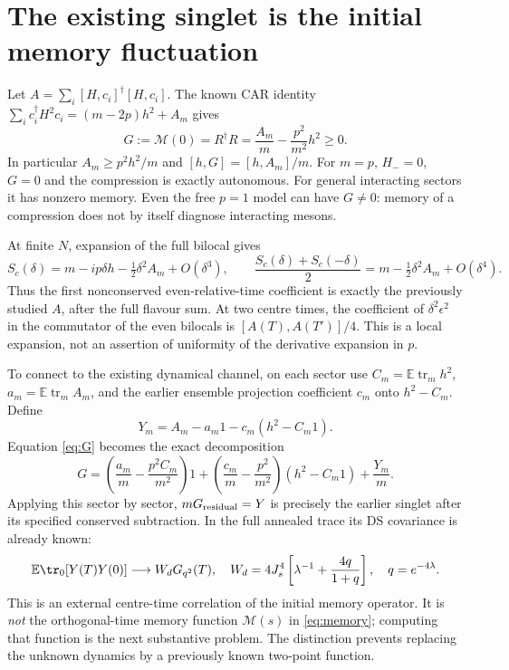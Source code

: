 \documentclass[11pt,a4paper]{article}
\newcommand{\EE}{\mathbb E}
\newcommand{\trm}{\operatorname{tr}_m}
\begin{document}
\newpage
\section{The existing singlet is the initial memory fluctuation}
Let $A=\sum_i[H,c_i]^\dagger[H,c_i]$. The known CAR identity
$\sum_i c_i^\dagger H^2c_i=(m-2p)h^2+A_m$ gives
\begin{equation}\label{eq:G}
 G:=\mathcal M(0)=R^\dagger R
 =\frac{A_m}{m}-\frac{p^2}{m^2}h^2\geq0.
\end{equation}
In particular $A_m\geq p^2h^2/m$ and
$[h,G]=[h,A_m]/m$. For $m=p$, $H_-=0$, $G=0$ and the
compression is exactly autonomous. For general interacting sectors
it has nonzero memory. Even the free $p=1$ model can have $G\ne0$:
memory of a compression does not by itself diagnose interacting mesons.

At finite $N$, expansion of the full bilocal gives
\begin{equation}
 S_c(\delta)=m-ip\delta h-\tfrac12\delta^2 A_m+O(\delta^3),
 \qquad
 \frac{S_c(\delta)+S_c(-\delta)}2
 =m-\tfrac12\delta^2 A_m+O(\delta^4).
\end{equation}
Thus the first nonconserved even-relative-time coefficient is exactly
the previously studied $A$, after the full flavour sum. At two centre
times, the coefficient of $\delta^2\epsilon^2$ in the commutator of
the even bilocals is $[A(T),A(T')]/4$. This is a local expansion,
not an assertion of uniformity of the derivative expansion in $p$.

To connect to the existing dynamical channel, on each sector use
$C_m=\EE\trm h^2$, $a_m=\EE\trm A_m$, and the earlier ensemble
projection coefficient $c_m$ onto $h^2-C_m$. Define
\begin{equation}
 Y_m=A_m-a_m1-c_m(h^2-C_m1).
\end{equation}
Equation \eqref{eq:G} becomes the exact decomposition
\begin{equation}\label{eq:decomp}
 G=\left(\frac{a_m}m-\frac{p^2C_m}{m^2}\right)1
 +\left(\frac{c_m}m-\frac{p^2}{m^2}\right)(h^2-C_m1)
 +\frac{Y_m}m.
\end{equation}
Applying this sector by sector, $mG_{\rm residual}=Y$ is precisely
the earlier singlet after its specified conserved subtraction.
In the full annealed trace its DS covariance is already known:
\begin{equation}
 \EE\tr_0[Y(T)Y(0)]\longrightarrow W_dG_{q^2}(T),\quad
 W_d=4J_s^4\left[\lambda^{-1}+\frac{4q}{1+q}\right],\quad
 q=e^{-4\lambda}.
\end{equation}
This is an external centre-time correlation of the initial memory
operator. It is \emph{not} the orthogonal-time memory function
$\mathcal M(s)$ in \eqref{eq:memory}; computing that function is the
next substantive problem. The distinction prevents replacing the
unknown dynamics by a previously known two-point function.
\end{document}
